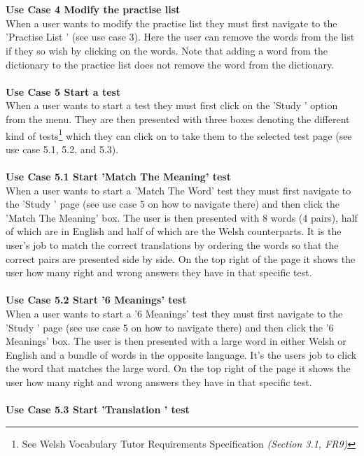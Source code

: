 \documentclass{project}
\newcommand*{\icon}[1]{%
  \raisebox{-.3\baselineskip}{%
    \texttt{[image: \#1]}%
  }%
}
\begin{document}
\\\\
\textbf{Use Case 4 Modify the practise list}
\\
When a user wants to modify the practise list they must first navigate to the 'Practise List \icon{practise-icon}' (see use case 3). Here the user can remove the words from the list if they so wish by clicking on the words. Note that adding a word from the dictionary to the practice list does not remove the word from the dictionary.
\\\\
\textbf{Use Case 5 Start a test}
\\
When a user wants to start a test they must first click on the 'Study \icon{study-icon}' option from the menu. They are then presented with three boxes denoting the different kind of tests\footnote{See Welsh Vocabulary Tutor Requirements Specification\cite{se.qa.csrs} \textit{(Section 3.1, FR9)}} which they can click on to take them to the selected test page (see use case 5.1, 5.2, and 5.3).
\\\\
\textbf{Use Case 5.1 Start 'Match The Meaning' test}
\\
When a user wants to start a 'Match The Word' test they must first navigate to the 'Study \icon{study-icon}' page (see use case 5 on how to navigate there) and then click the 'Match The Meaning' box. The user is then presented with 8 words (4 pairs), half of which are in English and half of which are the Welsh counterparts. It is the user's job to match the correct translations by ordering the words so that the correct pairs are presented side by side. On the top right of the page it shows the user how many right and wrong answers they have in that specific test.
\\\\
\textbf{Use Case 5.2 Start '6 Meanings' test}
\\
When a user wants to start a '6 Meanings' test they must first navigate to the 'Study \icon{study-icon}' page (see use case 5 on how to navigate there) and then click the '6 Meanings' box. The user is then presented with a large word in either Welsh or English and a bundle of words in the opposite language. It's the users job to click the word that matches the large word. On the top right of the page it shows the user how many right and wrong answers they have in that specific test.
\\\\
\textbf{Use Case 5.3 Start 'Translation ' test}
\end{document}
